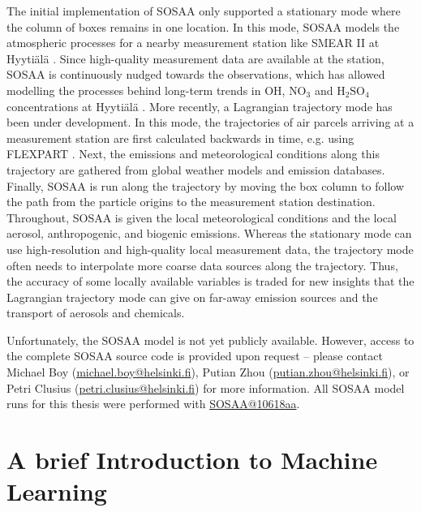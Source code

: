 \noindent The initial implementation of SOSAA only supported a stationary mode where the column of boxes remains in one location. In this mode, SOSAA models the atmospheric processes for a nearby measurement station like SMEAR II at Hyyti\"al\"a \cite{smear-station-2013}. Since high-quality measurement data are available at the station, SOSAA is continuously nudged towards the observations, which has allowed modelling the processes behind long-term trends in $\text{OH}$, $\text{NO}_3$ and $\text{H}_2\text{SO}_4$ concentrations at Hyyti\"al\"a \cite{sosaa-trends-2021}. More recently, a Lagrangian trajectory mode has been under development. In this mode, the trajectories of air parcels arriving at a measurement station are first calculated backwards in time, e.g. using FLEXPART \cite{flexpart-validation-1998, flexpart-correction-1999, flexpart-6.2-2005, flexpart-10.4-2019}. Next, the emissions and meteorological conditions along this trajectory are gathered from global weather models and emission databases. Finally, SOSAA is run along the trajectory by moving the box column to follow the path from the particle origins to the measurement station destination. Throughout, SOSAA is given the local meteorological conditions and the local aerosol, anthropogenic, and biogenic emissions. Whereas the stationary mode can use high-resolution and high-quality local measurement data, the trajectory mode often needs to interpolate more coarse data sources along the trajectory. Thus, the accuracy of some locally available variables is traded for new insights that the Lagrangian trajectory mode can give on far-away emission sources and the transport of aerosols and chemicals.

\newpar Unfortunately, the SOSAA model is not yet publicly available. However, access to the complete SOSAA source code is provided upon request -- please contact Michael Boy (\href{mailto:michael.boy@helsinki.fi}{michael.boy@helsinki.fi}), Putian Zhou (\href{mailto:putian.zhou@helsinki.fi}{putian.zhou@helsinki.fi}), or Petri Clusius (\href{mailto:petri.clusius@helsinki.fi}{petri.clusius@helsinki.fi}) for more information. All SOSAA model runs for this thesis were performed with \href{https://version.helsinki.fi/putian.zhou/sosaa/-/tree/10618aa98c7470546308adf132afb0bc0735b4eb}{SOSAA@10618aa}.

\section{A brief Introduction to Machine Learning} \label{txt:machine-learning}

